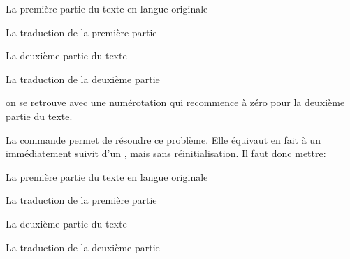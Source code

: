 \begin{latexcode}
\begin{pages}  
    \begin{Leftside}  \beginnumbering 
La première partie du texte en langue originale
    \endnumbering  \end{Leftside} 
 
    \begin{Rightside} \beginnumbering
La traduction de la première partie
    \endnumbering \end{Rightside} 
 \Pages
 
    \begin{Leftside} \beginnumbering  
La deuxième partie du texte 
    \endnumbering  \end{Leftside} 
 
    \begin{Rightside}  \beginnumbering
La traduction de la deuxième partie
    \endnumbering \end{Rightside} 
 \Pages

  \end{pages}
\end{latexcode}

on se retrouve avec une numérotation qui recommence à zéro pour la deuxième partie du texte. 

La commande  permet de résoudre ce problème. Elle équivaut en fait à un  immédiatement suivit d'un , mais sans réinitialisation. Il faut donc mettre: 

\begin{latexcode}
\begin{pages}  
    \begin{Leftside}  \beginnumbering 
La première partie du texte en langue originale
 \end{Leftside} %
 
\begin{Rightside} \beginnumbering
La traduction de la première partie
 \end{Rightside} %
 \Pages
 
    \begin{Leftside} \memorydump %
La deuxième partie du texte 
    \endnumbering  \end{Leftside}
    
    \begin{Rightside}  \memorydump %
La traduction de la deuxième partie
    \endnumbering \end{Rightside}   %
 
 \Pages

  \end{pages}
\end{latexcode}

